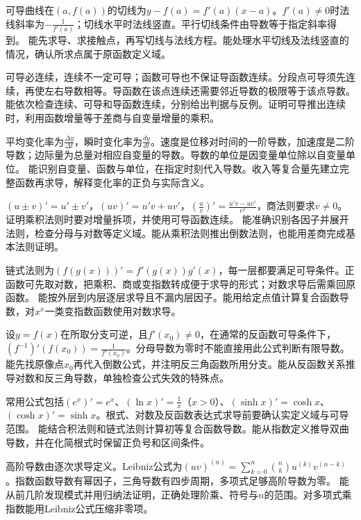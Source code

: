 {可导曲线在$(a,f(a))$的切线为$y-f(a)=f'(a)(x-a)$。$f'(a)\ne0$时法线斜率为$-\frac{1}{f'(a)}$；切线水平时法线竖直。平行切线条件由导数等于指定斜率得到。}
{能先求导、求接触点，再写切线与法线方程。能处理水平切线及法线竖直的情况，确认所求点属于原函数定义域。}

{可导必连续，连续不一定可导；函数可导也不保证导函数连续。分段点可导须先连续，再使左右导数相等。导函数在该点连续还需要邻近导数的极限等于该点导数。}
{能依次检查连续、可导和导函数连续，分别给出判据与反例。证明可导推出连续时，利用函数增量等于差商与自变量增量的乘积。}

{平均变化率为$\frac{\Delta y}{\Delta t}$，瞬时变化率为$\frac{dy}{dt}$。速度是位移对时间的一阶导数，加速度是二阶导数；边际量为总量对相应自变量的导数。导数的单位是因变量单位除以自变量单位。}
{能识别自变量、函数与单位，在指定时刻代入导数。收入等复合量先建立完整函数再求导，解释变化率的正负与实际含义。}

{$(u\pm v)'=u'\pm v'$，$(uv)'=u'v+uv'$，$\left(\frac uv\right)'=\frac{u'v-uv'}{v^2}$，商法则要求$v\ne0$。证明乘积法则时要对增量拆项，并使用可导函数连续。}
{能准确识别各因子并展开法则，检查分母与对数等定义域。能从乘积法则推出倒数法则，也能用差商完成基本法则证明。}

{链式法则为$(f(g(x)))'=f'(g(x))g'(x)$，每一层都要满足可导条件。正函数可先取对数，把乘积、商或变指数转成便于求导的形式；对数求导后需乘回原函数。}
{能按外层到内层逐层求导且不漏内层因子。能用给定点值计算复合函数导数，对$x^x$一类变指数函数使用对数求导。}

{设$y=f(x)$在所取分支可逆，且$f'(x_0)\ne0$，在通常的反函数可导条件下，$(f^{-1})'(f(x_0))=\frac{1}{f'(x_0)}$。分母导数为零时不能直接用此公式判断有限导数。}
{能先找原像点$x_0$再代入倒数公式，并注明反三角函数所用分支。能从反函数关系推导对数和反三角导数，单独检查公式失效的特殊点。}

{常用公式包括$(e^x)'=e^x$、$(\ln x)'=\frac1x$（$x>0$）、$(\sinh x)'=\cosh x$、$(\cosh x)'=\sinh x$。根式、对数及反函数表达式求导前要确认实定义域与可导范围。}
{能结合积法则和链式法则计算初等复合函数导数。能从指数定义推导双曲导数，并在化简根式时保留正负号和区间条件。}

{高阶导数由逐次求导定义。Leibniz公式为$(uv)^{(n)}=\sum_{k=0}^n\binom nk u^{(k)}v^{(n-k)}$。指数函数导数有幂因子，三角导数有四步周期，多项式足够高阶导数为零。}
{能从前几阶发现模式并用归纳法证明，正确处理阶乘、符号与$n$的范围。对多项式乘指数能用Leibniz公式压缩非零项。}

